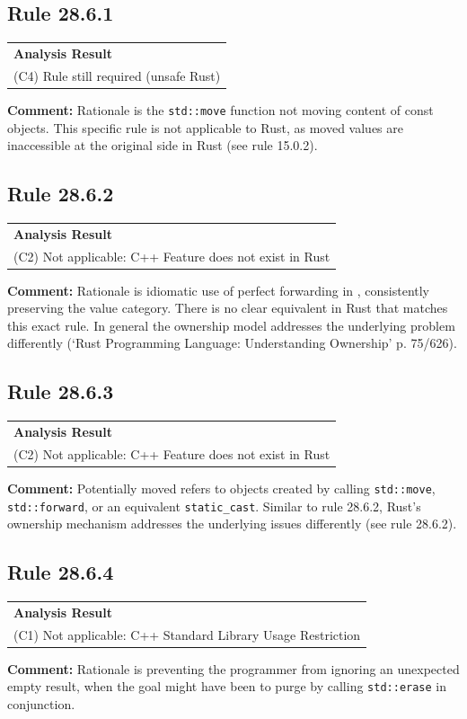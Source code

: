 \subsection*{Rule 28.6.1}
\begin{longtable}{p{13cm}}
\textbf{Analysis Result} \\
(C4) Rule still required (unsafe Rust) \\
\end{longtable}
\textbf{Comment:} Rationale is the \texttt{std::move} function not moving content of const objects. This specific rule is not applicable to Rust, as moved values are inaccessible at the original side in Rust (see rule 15.0.2). \\
\subsection*{Rule 28.6.2}
\begin{longtable}{p{13cm}}
\textbf{Analysis Result} \\
(C2) Not applicable: C++ Feature does not exist in Rust \\
\end{longtable}
\textbf{Comment:} Rationale is idiomatic use of perfect forwarding in \Cpp, consistently preserving the value category. There is no clear equivalent in Rust that matches this exact rule. In general the ownership model addresses the underlying problem differently (`Rust Programming Language: Understanding Ownership' p. 75/626). \\
\subsection*{Rule 28.6.3}
\begin{longtable}{p{13cm}}
\textbf{Analysis Result} \\
(C2) Not applicable: C++ Feature does not exist in Rust \\
\end{longtable}
\textbf{Comment:} Potentially moved refers to objects created by calling \texttt{std::move}, \texttt{std::forward}, or an equivalent \texttt{static\_cast}. Similar to rule 28.6.2, Rust's ownership mechanism addresses the underlying issues differently (see rule 28.6.2). \\
\subsection*{Rule 28.6.4}
\begin{longtable}{p{13cm}}
\textbf{Analysis Result} \\
(C1) Not applicable: C++ Standard Library Usage Restriction \\
\end{longtable}
\textbf{Comment:} Rationale is preventing the programmer from ignoring an unexpected empty result, when the goal might have been to purge by calling \texttt{std::erase} in conjunction. \\
